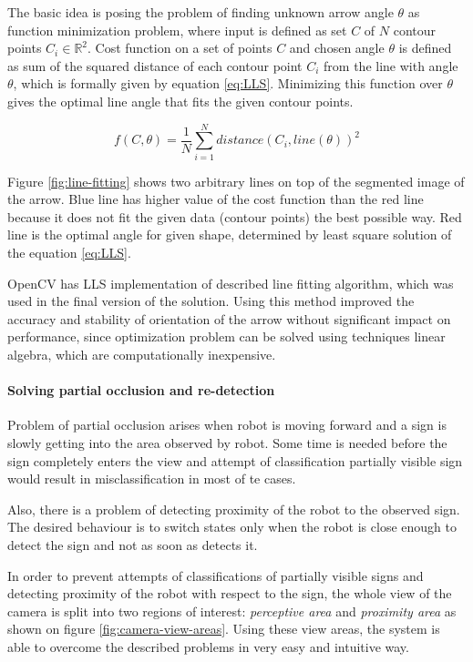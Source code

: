 The basic idea is posing the problem of finding unknown arrow angle $\theta$ as function minimization problem, where input is defined as set $C$ of $N$ contour points $C_i \in \mathbb{R}^2$. Cost function on a set of points $C$ and chosen angle $\theta$ is defined as sum of the squared distance of each contour point $C_i$ from the line with angle $\theta$, which is formally given by equation \ref{eq:LLS}. Minimizing this function over $\theta$ gives the optimal line angle that fits the given contour points.

\begin{equation}
f(C,\theta)=
\frac{1}{N}
\sum_{i=1}^{N}distance(C_i, line(\theta))^2
\label{eq:LLS}
\end{equation}

Figure \ref{fig:line-fitting} shows two arbitrary lines on top of the segmented image of the arrow. Blue line has higher value of the cost function than the red line because it does not fit the given data (contour points) the best possible way. Red line is the optimal angle for given shape, determined by least square solution of the equation \ref{eq:LLS}.

OpenCV has LLS implementation of described line fitting algorithm, which was used in the final version of the solution. Using this method improved the accuracy and stability of orientation of the arrow without significant impact on performance, since optimization problem can be solved using techniques linear algebra, which are computationally inexpensive.

\paragraph{Solving partial occlusion and re-detection}

Problem of partial occlusion arises when robot is moving forward and a sign is slowly getting into the area observed by robot. Some time is needed before the sign completely enters the view and attempt of classification partially visible sign would result in misclassification in most of te cases.

Also, there is a problem of detecting proximity of the robot to the observed sign. The desired behaviour is to switch states only when the robot is close enough to detect the sign and not as soon as detects it.

In order to prevent attempts of classifications of partially visible signs and detecting proximity of the robot with respect to the sign, the whole view of the camera is split into two regions of interest: \textit{perceptive area} and \textit{proximity area} as shown on figure \ref{fig:camera-view-areas}. Using these view areas, the system is able to overcome the described problems in very easy and intuitive way.

